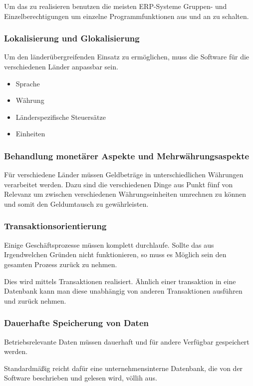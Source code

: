 Um das zu realisieren benutzen die meisten ERP-Systeme Gruppen- und
Einzelberechtigungen um einzelne Programmfunktionen aus und an zu schalten.

\subsubsection{Lokalisierung und Glokalisierung}
Um den länderübergreifenden Einsatz zu ermöglichen, muss die Software für die
verschiedenen Länder anpassbar sein. 

\begin{itemize}
  \item Sprache
  \item Währung
  \item Länderspezifische Steuersätze
  \item Einheiten 
\end{itemize}

\subsubsection{Behandlung monetärer Aspekte und Mehrwährungsaspekte}
Für verschiedene Länder müssen Geldbeträge in unterschiedlichen Währungen
verarbeitet werden. Dazu sind die verschiedenen Dinge aus Punkt fünf von
Relevanz um \zB zwischen verschiedenen Währungseinheiten umrechnen zu können
und somit den Geldumtausch zu gewährleisten.

\subsubsection{Transaktionsorientierung}
Einige Geschäftsprozesse müssen komplett durchlaufe. Sollte das aus
Irgendwelchen Gründen nicht funktionieren, so muss es Möglich sein den gesamten
Prozess zurück zu nehmen. 

Dies wird mittels Transaktionen realisiert. Ähnlich einer transaktion in eine
Datenbank kann man diese unabhängig von anderen Transaktionen ausführen und
zurück nehmen.

\subsubsection{Dauerhafte Speicherung von Daten}
Betriebsrelevante Daten müssen dauerhaft und für andere Verfügbar gespeichert
werden. 

Standardmäßig reicht dafür eine unternehmensinterne Datenbank, die von der
Software beschrieben und gelesen wird, völlih aus.

